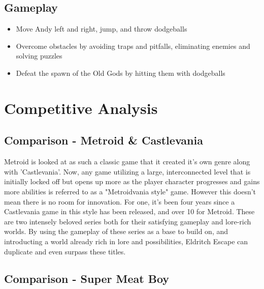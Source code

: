 \documentclass [12pt]{article}
\begin{document}
\subsection*{Gameplay}

\begin{itemize}
\item Move Andy left and right, jump, and throw dodgeballs
\item Overcome obstacles by avoiding traps and pitfalls, eliminating enemies and solving puzzles
\item Defeat the spawn of the Old Gods by hitting them with dodgeballs
\end{itemize}

\section*{Competitive Analysis}

\subsection*{Comparison - Metroid & Castlevania}

Metroid is looked at as such a classic game that it created it's own genre along with 'Castlevania'. Now, any game utilizing a large, interconnected level that is initially locked off but opens up more as the player character progresses and gains more abilities is referred to as a "Metroidvania style" game. However this doesn't mean there is no room for innovation. For one, it's been four years since a Castlevania game in this style has been released, and over 10 for Metroid. These are two intensely beloved series both for their satisfying gameplay and lore-rich worlds. By using the gameplay of these series as a base to build on, and introducting a world already rich in lore and possibilities, Eldritch Escape can duplicate and even surpass these titles.

\subsection*{Comparison - Super Meat Boy}
\end{document}
